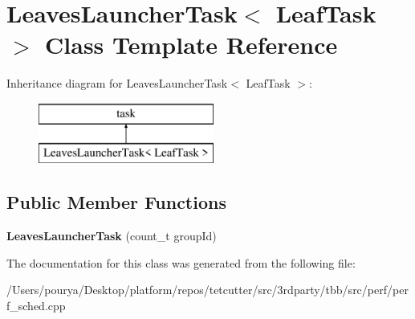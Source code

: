\hypertarget{classLeavesLauncherTask}{}\section{Leaves\+Launcher\+Task$<$ Leaf\+Task $>$ Class Template Reference}
\label{classLeavesLauncherTask}
Inheritance diagram for Leaves\+Launcher\+Task$<$ Leaf\+Task $>$\+:\begin{figure}[H]
\begin{center}
\leavevmode
\includegraphics[height=2.000000cm]{classLeavesLauncherTask}
\end{center}
\end{figure}
\subsection*{Public Member Functions}
\begin{DoxyCompactItemize}
\item 
\hypertarget{classLeavesLauncherTask_a547ce68d333812b4d5532607e67d699f}{}{\bfseries Leaves\+Launcher\+Task} (count\+\_\+t group\+Id)\label{classLeavesLauncherTask_a547ce68d333812b4d5532607e67d699f}

\end{DoxyCompactItemize}


The documentation for this class was generated from the following file\+:\begin{DoxyCompactItemize}
\item 
/\+Users/pourya/\+Desktop/platform/repos/tetcutter/src/3rdparty/tbb/src/perf/perf\+\_\+sched.\+cpp\end{DoxyCompactItemize}
